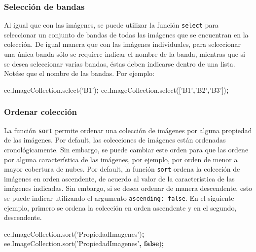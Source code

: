 \documentclass[
]{article}
\newenvironment{Shaded}{\begin{snugshade}}{\end{snugshade}}
\newcommand{\AttributeTok}[1]{\textcolor[rgb]{0.77,0.63,0.00}{#1}}
\newcommand{\KeywordTok}[1]{\textcolor[rgb]{0.13,0.29,0.53}{\textbf{#1}}}
\newcommand{\NormalTok}[1]{#1}
\newcommand{\OperatorTok}[1]{\textcolor[rgb]{0.81,0.36,0.00}{\textbf{#1}}}
\newcommand{\StringTok}[1]{\textcolor[rgb]{0.31,0.60,0.02}{#1}}
\newcommand{\VariableTok}[1]{\textcolor[rgb]{0.00,0.00,0.00}{#1}}
\begin{document}
\hypertarget{selecciuxf3n-de-bandas-1}{%
\subsubsection{Selección de bandas}\label{selecciuxf3n-de-bandas-1}}

Al igual que con las imágenes, se puede utilizar la función
\texttt{select} para seleccionar un conjunto de bandas de todas las
imágenes que se encuentran en la colección. De igual manera que con las
imágenes individuales, para seleccionar una única banda sólo se requiere
indicar el nombre de la banda, mientras que si se desea seleccionar
varias bandas, éstas deben indicarse dentro de una lista. Notése que el
nombre de las bandas. Por ejemplo:

\begin{Shaded}
\begin{Highlighting}[]
\VariableTok{ee}\NormalTok{.}\VariableTok{ImageCollection}\NormalTok{.}\AttributeTok{select}\NormalTok{(}\StringTok{'B1'}\NormalTok{)}\OperatorTok{;}
\VariableTok{ee}\NormalTok{.}\VariableTok{ImageCollection}\NormalTok{.}\AttributeTok{select}\NormalTok{([}\StringTok{'B1'}\OperatorTok{,}\StringTok{'B2'}\OperatorTok{,}\StringTok{'B3'}\NormalTok{])}\OperatorTok{;}
\end{Highlighting}
\end{Shaded}

\hypertarget{ordenar-colecciuxf3n}{%
\subsubsection{Ordenar colección}\label{ordenar-colecciuxf3n}}

La función \texttt{sort} permite ordenar una colección de imágenes por
alguna propiedad de las imágenes. Por default, las colecciones de
imágenes están ordenadas cronológicamente. Sin embargo, se puede cambiar
este orden para que las ordene por alguna característica de las
imágenes, por ejemplo, por orden de menor a mayor cobertura de nubes.
Por default, la función \texttt{sort} ordena la colección de imágenes en
orden ascendente, de acuerdo al valor de la característica de las
imágenes indicadas. Sin embargo, si se desea ordenar de manera
descendente, esto se puede indicar utilizando el argumento
\texttt{ascending:\ false}. En el siguiente ejemplo, primero se ordena
la colección en orden ascendente y en el segundo, descendente.

\begin{Shaded}
\begin{Highlighting}[]
\VariableTok{ee}\NormalTok{.}\VariableTok{ImageCollection}\NormalTok{.}\AttributeTok{sort}\NormalTok{(}\StringTok{'PropiedadImagenes'}\NormalTok{)}\OperatorTok{;}
\VariableTok{ee}\NormalTok{.}\VariableTok{ImageCollection}\NormalTok{.}\AttributeTok{sort}\NormalTok{(}\StringTok{'PropiedadImagenes'}\OperatorTok{,} \KeywordTok{false}\NormalTok{)}\OperatorTok{;}
\end{Highlighting}
\end{Shaded}
\end{document}
